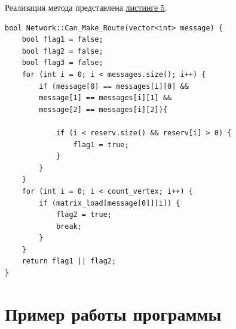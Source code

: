\documentclass[11pt,a4paper,final]{article} %
\begin{document}
Реализация метода представлена \hyperref[lst5]{листинге 5}.

\begin{lstlisting}[label=lst5, caption = {Метод Can\_Make\_RouteStep}]
bool Network::Can_Make_Route(vector<int> message) {
	bool flag1 = false;
	bool flag2 = false;
	bool flag3 = false;
	for (int i = 0; i < messages.size(); i++) {
		if (message[0] == messages[i][0] &&
		message[1] == messages[i][1] &&
		message[2] == messages[i][2]){
			
			if (i < reserv.size() && reserv[i] > 0) {
				flag1 = true;
			}
		}
	}
	for (int i = 0; i < count_vertex; i++) {
		if (matrix_load[message[0]][i]) {
			flag2 = true;
			break;
		}
	}
	return flag1 || flag2;
}
\end{lstlisting}

\newpage
\section{Пример работы программы}
\end{document}
